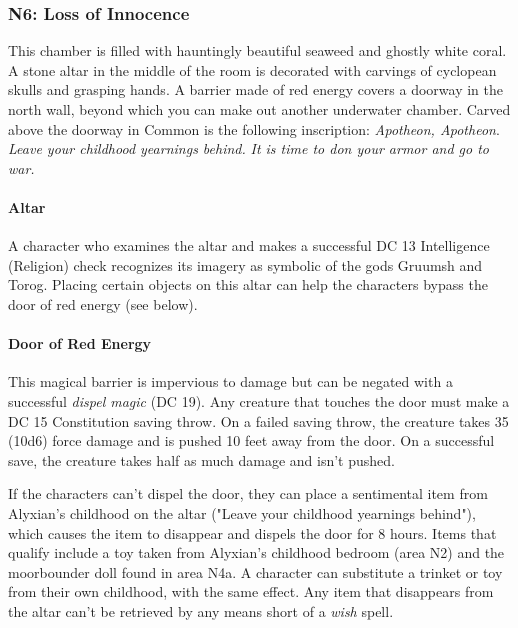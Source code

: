 \documentclass[a4paper, 11pt, bg=full, twocolumn, nooutline]{dndbook}
\begin{document}
\subsubsection{N6: Loss of Innocence}

\begin{DndReadAloud}
This chamber is filled with hauntingly beautiful seaweed and ghostly white coral. A stone altar in the middle of the room is decorated with carvings of cyclopean skulls and grasping hands.
A barrier made of red energy covers a doorway in the north wall, beyond which you can make out another underwater chamber. Carved above the doorway in Common is the following inscription:
\textit{Apotheon, Apotheon}.
\textit{Leave your childhood yearnings behind.}
\textit{It is time to don your armor and go to war.}
\end{DndReadAloud}

\paragraph{Altar}

A character who examines the altar and makes a successful DC 13 Intelligence (Religion) check recognizes its imagery as symbolic of the gods Gruumsh and Torog. Placing certain objects on this altar can help the characters bypass the door of red energy (see below).

\paragraph{Door of Red Energy}

This magical barrier is impervious to damage but can be negated with a successful \textit{dispel magic} (DC 19). Any creature that touches the door must make a DC 15 Constitution saving throw. On a failed saving throw, the creature takes 35 (10d6) force damage and is pushed 10 feet away from the door. On a successful save, the creature takes half as much damage and isn't pushed.

If the characters can't dispel the door, they can place a sentimental item from Alyxian's childhood on the altar ("Leave your childhood yearnings behind"), which causes the item to disappear and dispels the door for 8 hours. Items that qualify include a toy taken from Alyxian's childhood bedroom (area N2) and the moorbounder doll found in area N4a. A character can substitute a trinket or toy from their own childhood, with the same effect. Any item that disappears from the altar can't be retrieved by any means short of a \textit{wish} spell.
\end{document}
